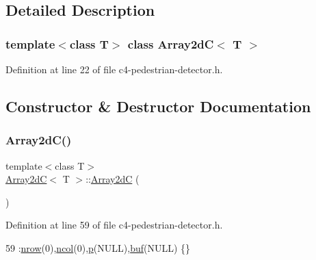 \subsection{Detailed Description}
\subsubsection*{template$<$class T$>$\newline
class Array2d\+C$<$ T $>$}



Definition at line 22 of file c4-\/pedestrian-\/detector.\+h.



\subsection{Constructor \& Destructor Documentation}
\mbox{\label{class_array2d_c_a740d2592aa5563d59ff429311c51a04e}} 
\subsubsection{\texorpdfstring{Array2d\+C()}{Array2dC()}\hspace{0.1cm}{\footnotesize\ttfamily [1/3]}}
{\footnotesize\ttfamily template$<$class T$>$ \\
\mbox{\hyperlink{class_array2d_c}{Array2dC}}$<$ T $>$\+::\mbox{\hyperlink{class_array2d_c}{Array2dC}} (\begin{DoxyParamCaption}{ }\end{DoxyParamCaption})\hspace{0.3cm}{\ttfamily [inline]}}



Definition at line 59 of file c4-\/pedestrian-\/detector.\+h.


\begin{DoxyCode}
59 :\mbox{\hyperlink{class_array2d_c_a12f690f7195f7674a86a7e1eedbc473c}{nrow}}(0),\mbox{\hyperlink{class_array2d_c_a27e0f8f40f644831cd7c750db59dc28a}{ncol}}(0),\mbox{\hyperlink{class_array2d_c_a727eae5d663d463635cc150e6f771f0d}{p}}(NULL),\mbox{\hyperlink{class_array2d_c_a25d8fa5049d4c7ded126e0acdd18f37a}{buf}}(NULL) \{\}
\end{DoxyCode}
\mbox{\label{class_array2d_c_a626db69cb139292c8249114172c10528}} 
